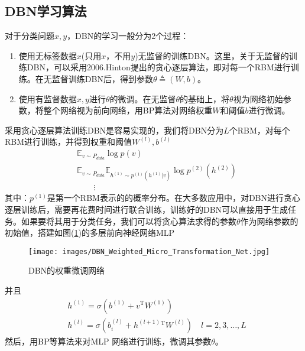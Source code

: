     \subsection{DBN学习算法}
        \par
        对于分类问题$x,y$，DBN的学习一般分为2个过程：
        \begin{enumerate}
        \item 使用无标签数据$x$(只用$x$，不用$y$)无监督的训练DBN。这里，关于无监督的训练DBN，可以采用2006.Hinton提出的贪心逐层算法，即对每一个RBM进行训练。在无监督训练DBN后，得到参数$\theta\triangleq (W,b)$。
        \item 使用有监督数据$x,y$进行$\theta$的微调。在无监督$\theta$的基础上，将$\theta$视为网络初始参数，将整个网络视为前向网络，用BP算法对网络权重$W$和阈值$b$进行微调。
        \end{enumerate}
        \par
        采用贪心逐层算法训练DBN是容易实现的，我们将DBN分为$L$个RBM，对每个RBM进行训练，并得到权重和阈值$W^{(l)},b^{(l)}$
        \begin{align*}
        & \mathbb{E} _{v\sim P_{data}} \log p(v)\\
        & \mathbb{ E}_{v\sim P_{data}} \mathbb{E}_{h^{(1)}\sim p^{(1)}(h^{(1)}|v)} \log p^{(2)}(h^{(2)})\\
        & \qquad \vdots
        \end{align*}
        其中：$p^{(1)}$是第一个RBM表示的的概率分布。在大多数应用中，对DBN进行贪心逐层训练后，需要再花费时间进行联合训练，训练好的DBN可以直接用于生成任务。如果要将其用于分类任务，我们可以将贪心算法求得的参数$\theta$作为网络参数的初始值，搭建如图(\ref{fig:DBN的权重微调网络})的多层前向神经网络MLP
            \begin{figure}[H]
            \centering
            \texttt{[image: images/DBN\_Weighted\_Micro\_Transformation\_Net.jpg]}
            \caption{DBN的权重微调网络}
            \label{fig:DBN的权重微调网络}
            \end{figure}
        并且
        \begin{align*}
        & h^{(1)} = \sigma \left( b^{(1)} + v^\mathrm{T}W^{(1)} \right) \\
        & h^{(l)} = \sigma \left( b_i^{(l)} + h^{(l+1)}{}^\mathrm{T} W^{(l)} \right) \quad l = 2,3,\dots,L
        \end{align*}
        然后，用BP等算法来对MLP 网络进行训练，微调其参数$\theta$。


